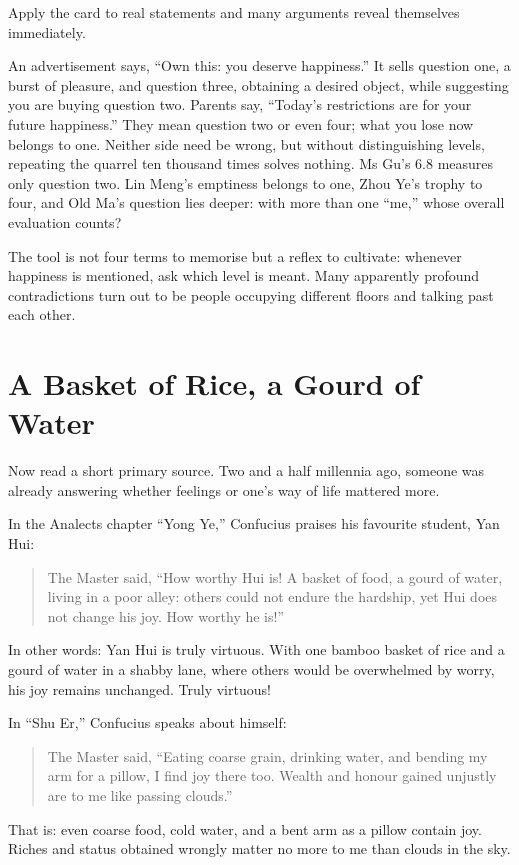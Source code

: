 Apply the card to real statements and many arguments reveal themselves immediately.

An advertisement says, ``Own this: you deserve happiness.'' It sells question one, a burst of pleasure, and question three, obtaining a desired object, while suggesting you are buying question two. Parents say, ``Today's restrictions are for your future happiness.'' They mean question two or even four; what you lose now belongs to one. Neither side need be wrong, but without distinguishing levels, repeating the quarrel ten thousand times solves nothing. Ms Gu's 6.8 measures only question two. Lin Meng's emptiness belongs to one, Zhou Ye's trophy to four, and Old Ma's question lies deeper: with more than one ``me,'' whose overall evaluation counts?

The tool is not four terms to memorise but a reflex to cultivate: whenever happiness is mentioned, ask which level is meant. Many apparently profound contradictions turn out to be people occupying different floors and talking past each other.

\section{A Basket of Rice, a Gourd of Water}
Now read a short primary source. Two and a half millennia ago, someone was already answering whether feelings or one's way of life mattered more.

In the Analects chapter ``Yong Ye,'' Confucius praises his favourite student, Yan Hui:

\begin{quote}
The Master said, ``How worthy Hui is! A basket of food, a gourd of water, living in a poor alley: others could not endure the hardship, yet Hui does not change his joy. How worthy he is!''
\end{quote}
In other words: Yan Hui is truly virtuous. With one bamboo basket of rice and a gourd of water in a shabby lane, where others would be overwhelmed by worry, his joy remains unchanged. Truly virtuous!

In ``Shu Er,'' Confucius speaks about himself:

\begin{quote}
The Master said, ``Eating coarse grain, drinking water, and bending my arm for a pillow, I find joy there too. Wealth and honour gained unjustly are to me like passing clouds.''
\end{quote}
That is: even coarse food, cold water, and a bent arm as a pillow contain joy. Riches and status obtained wrongly matter no more to me than clouds in the sky.

